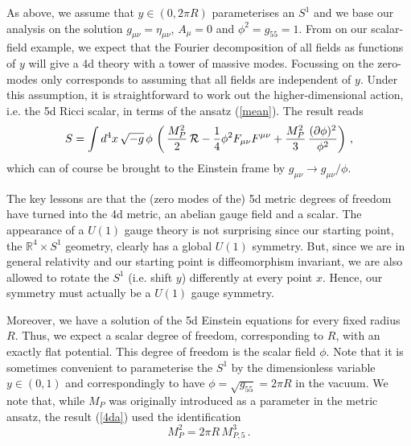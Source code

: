 \documentclass[12pt]{article}
\newcommand{\be}{\begin{equation}}
\newcommand{\ee}{\end{equation}}
\numberwithin{equation}{section}
\begin{document}
As above, we assume that $y\in (0,2\pi R)$ parameterises an $S^1$ and we base our analysis on the solution $g_{\mu\nu}=\eta_{\mu\nu}$, $A_\mu=0$ and $\phi^2=g_{55}=1$. From on our scalar-field example, we expect that the Fourier decomposition of all fields as functions of $y$ will give a 4d theory with a tower of massive modes. Focussing on the zero-modes only corresponds to assuming that all fields are independent of $y$. Under this assumption, it is straightforward to work out the higher-dimensional action, i.e. the 5d Ricci scalar, in terms of the ansatz (\ref{mean}). The result reads~\cite{Appelquist:1987nr}
\be
S=\int d^4x\,\sqrt{-g}\,\phi\,\left(\,\frac{M_P^2}{2}\,{\cal R}-\frac{1}{4}\phi^2 F_{\mu\nu} F^{\mu\nu}+\frac{M_P^2}{3} \,\frac{(\partial \phi)^2}{\phi^2} \right)\,, \label{4da}
\ee
which can of course be brought to the Einstein frame by $g_{\mu\nu}\to g_{\mu\nu}/\phi$. 

The key lessons are that the (zero modes of the) 5d metric degrees of freedom have turned into the 4d metric, an abelian gauge field and a scalar. The appearance of a $U(1)$ gauge theory is not surprising since our starting point, the $\mathbb{R}^4\times S^1$ geometry, clearly has a global $U(1)$ symmetry. But, since we are in general relativity and our starting point is diffeomorphism invariant, we are also allowed to rotate the $S^1$ (i.e. shift $y$) differently at every point $x$. Hence, our symmetry must actually be a $U(1)$ gauge symmetry. 

Moreover, we have a solution of the 5d Einstein equations for every fixed radius $R$. Thus, we expect a scalar degree of freedom, corresponding to $R$, with an exactly flat potential. This degree of freedom is the scalar field $\phi$. Note that it is sometimes convenient to parameterise the $S^1$ by the dimensionless variable $y\in (0,1)$ and correspondingly to have $\phi=\sqrt{g_{55}}=2\pi R$ in the vacuum. We note that, while $M_P$ was originally introduced as a parameter in the metric ansatz, the result (\ref{4da}) used the identification
\be
M_P^2=2\pi R\, M_{P,5}^3\,.
\ee
\end{document}
